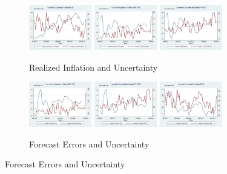 \documentclass[]{article}
\begin{document}
	
	\begin{figure}[ht]
		\centering
		\begin{subfigure}[b]{\textwidth}
			\centering
			\caption{Realized Inflation and Uncertainty}
			\label{InfVar}
			\includegraphics[width=0.3\textwidth]{figures/Inf1yf_CPIAU_varSCEM.png}
			\includegraphics[width=0.3\textwidth]{figures/Inf1yf_CPIAU_varSPFCPIQ.png}
			\includegraphics[width=0.3\textwidth]{figures/Inf1yf_PCE_varSPFPCEQ.png}
		\end{subfigure}
	    \vspace{1em}
		\vfill
		\begin{subfigure}[b]{\textwidth}
			\centering
			\caption{Forecast Errors and Uncertainty}
			\label{FEVar}
			\includegraphics[width=0.3\textwidth]{figures/SPFCPI_FE_varSPFCPIQ.png}
			\includegraphics[width=0.3\textwidth]{figures/SPFPCE_FE_varSPFPCEQ.png}
			\includegraphics[width=0.3\textwidth]{figures/SCE_FE_varSCEM.png}

\end{subfigure}
\end{figure}
\end{document}
